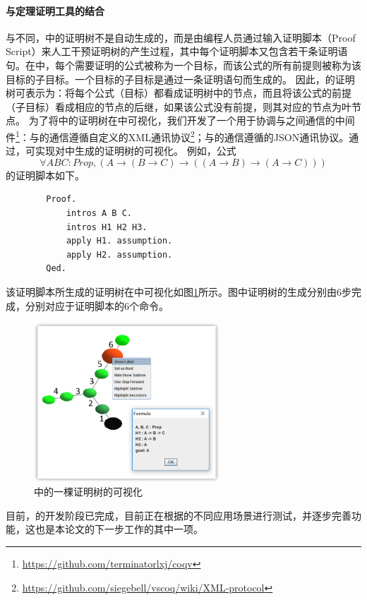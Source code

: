 \paragraph{与定理证明工具的结合}
与\sctlprov{}不同，中的证明树不是自动生成的，而是由编程人员通过输入证明脚本（Proof Script）来人工干预证明树的产生过程，其中每个证明脚本又包含若干条证明语句。在中，每个需要证明的公式被称为一个目标，而该公式的所有前提则被称为该目标的子目标。一个目标的子目标是通过一条证明语句而生成的。
因此，的证明树可表示为：将每个公式（目标）都看成证明树中的节点，而且将该公式的前提（子目标）看成相应的节点的后继，如果该公式没有前提，则其对应的节点为叶节点。
为了将中的证明树在中可视化，我们开发了一个用于协调与之间通信的中间件\footnote{\url{https://github.com/terminatorlxj/coqv}}：与的通信遵循自定义的XML通讯协议\footnote{\url{https://github.com/siegebell/vscoq/wiki/XML-protocol}}；与的通信遵循的JSON通讯协议。通过，可实现对中生成的证明树的可视化。
例如，公式$$\forall A B C: Prop, (A\rightarrow(B\rightarrow C)\rightarrow ((A\rightarrow B)\rightarrow(A\rightarrow C)))$$的证明脚本如下。
\begin{center}
		\begin{verbatim}
		Proof.
		    intros A B C.
		    intros H1 H2 H3.
		    apply H1. assumption.
		    apply H2. assumption.
		Qed.
		\end{verbatim}
	
\end{center}
该证明脚本所生成的证明树在中可视化如图\ref{vmdv:coq:vis}所示。图中证明树的生成分别由6步完成，分别对应于证明脚本的6个命令。
\begin{figure}[h!]
	\centering
	\includegraphics[width=7cm]{Img/coq_example.png}
	\caption{中的一棵证明树的可视化}
	\label{vmdv:coq:vis}
\end{figure}
目前，的开发阶段已完成，目前正在根据的不同应用场景进行测试，并逐步完善功能，这也是本论文的下一步工作的其中一项。

